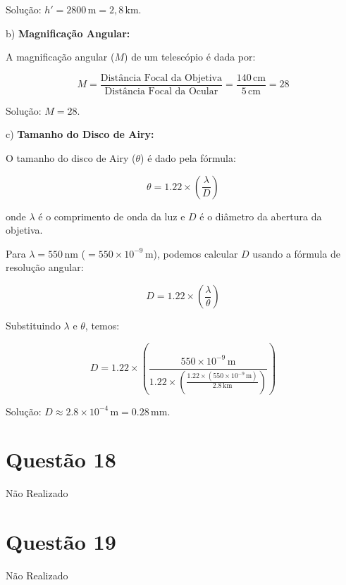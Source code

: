 \documentclass[a4paper, 12pt]{article}
\begin{document}
Solução: \(h' = 2800 \, \text{m} = 2,8 \, \text{km}\).

b) \textbf{Magnificação Angular:}

A magnificação angular (\(M\)) de um telescópio é dada por:

\[
M = \frac{\text{Distância Focal da Objetiva}}{\text{Distância Focal da Ocular}} = \frac{140 \, \text{cm}}{5 \, \text{cm}} = 28
\]

Solução: \(M = 28\).

c) \textbf{Tamanho do Disco de Airy:}

O tamanho do disco de Airy (\(\theta\)) é dado pela fórmula:

\[
\theta = 1.22 \times \left( \frac{\lambda}{D} \right)
\]

onde \(\lambda\) é o comprimento de onda da luz e \(D\) é o diâmetro da abertura da objetiva. 

Para \(\lambda = 550 \, \text{nm}\) (\(= 550 \times 10^{-9} \, \text{m}\)), podemos calcular \(D\) usando a fórmula de resolução angular:

\[
D = 1.22 \times \left( \frac{\lambda}{\theta} \right)
\]

Substituindo \(\lambda\) e \(\theta\), temos:

\[
D = 1.22 \times \left( \frac{550 \times 10^{-9} \, \text{m}}{1.22 \times \left( \frac{1.22 \times (550 \times 10^{-9} \, \text{m})}{2.8 \, \text{km}} \right)} \right)
\]

Solução: \(D \approx 2.8 \times 10^{-4} \, \text{m} = 0.28 \, \text{mm}\).

\section*{Questão 18}
Não Realizado

\section*{Questão 19}
Não Realizado
\end{document}
